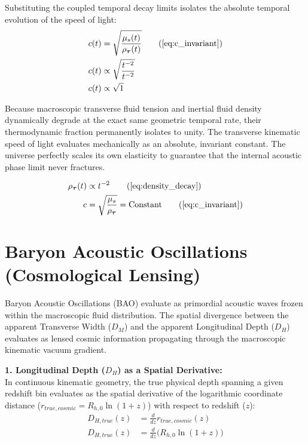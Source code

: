 \documentclass[11pt, a4paper]{article}
\begin{document}
Substituting the coupled temporal decay limits isolates the absolute temporal evolution of the speed of light:
\begin{align}
    c(t) &= \sqrt{\frac{\mu_s(t)}{\rho_{\boldsymbol{\tau}}(t)}} \tag{\ref{eq:c_invariant}} \\
    c(t) &\propto \sqrt{\frac{t^{-2}}{t^{-2}}}  \\
    c(t) &\propto \sqrt{1} 
\end{align}

Because macroscopic transverse fluid tension and inertial fluid density dynamically degrade at the exact same geometric temporal rate, their thermodynamic fraction permanently isolates to unity. The transverse kinematic speed of light evaluates mechanically as an absolute, invariant constant. The universe perfectly scales its own elasticity to guarantee that the internal acoustic phase limit never fractures.

\begin{tcolorbox}[recallbox, title={\ref{box:acoustic_invariance}. Cosmic Expansion \& Acoustic Invariance}]
\begin{align}
    \rho_{\boldsymbol{\tau}}(t) &\propto t^{-2} \tag{\ref{eq:density_decay}} \\
    c &= \sqrt{\frac{\mu_s}{\rho_{\boldsymbol{\tau}}}} = \text{Constant} \tag{\ref{eq:c_invariant}}
\end{align}
\end{tcolorbox}


\section{Baryon Acoustic Oscillations (Cosmological Lensing)}
\label{sec:deriv_bao_lensing}

Baryon Acoustic Oscillations (BAO) evaluate as primordial acoustic waves frozen within the macroscopic fluid distribution. The spatial divergence between the apparent Transverse Width ($D_M$) and the apparent Longitudinal Depth ($D_H$) evaluates as lensed cosmic information propagating through the macroscopic kinematic vacuum gradient.

\textbf{1. Longitudinal Depth ($D_H$) as a Spatial Derivative:} \\
In continuous kinematic geometry, the true physical depth spanning a given redshift bin evaluates as the spatial derivative of the logarithmic coordinate distance ($r_{true,cosmic} = R_{h,0} \ln(1+z)$) with respect to redshift ($z$):
\begin{align}
    D_{H,true}(z) &= \frac{d}{dz} r_{true,cosmic}(z) \\
    D_{H,true}(z) &= \frac{d}{dz} \Big(R_{h,0} \ln(1+z)\Big)
\end{align}
\end{document}
